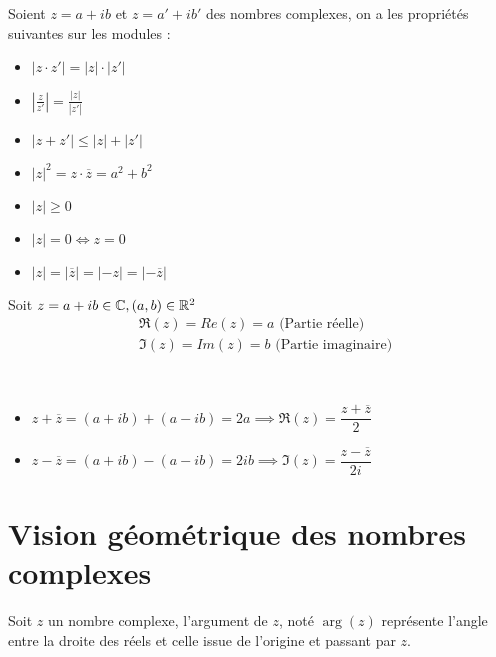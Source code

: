     \begin{proposition}
    Soient $z = a + ib$ et $z = a' + ib'$ des nombres complexes, on a les propriétés suivantes sur les modules :
    \begin{itemize}
        \item $|z \cdot z'| = |z| \cdot |z'|$
        \item $\left| \frac{z}{z'} \right| = \frac{|z|}{|z'|}$
        \item $|z + z'| \leq |z| + |z'|$
        \item $|z|^2 = z \cdot \overline{z} = a^2 + b^2$
        \item $|z| \geq 0$
        \item $|z| = 0 \iff z = 0$
        \item $|z| = |\overline{z}| = |-z| = |-\overline{z}|$
    \end{itemize}
\end{proposition}


    \begin{definition}
    Soit $z = a + ib \in \mathbb{C}, (a, b) \in \mathbb{R}^2$
    \begin{align*}
        &\Re(z) = Re(z) = a \text{ (Partie réelle)} \\
        &\Im(z) = Im(z) = b \text{ (Partie imaginaire)}
    \end{align*}
\end{definition}


\begin{proposition}~
    \begin{itemize}
        \item $z + \overline{z} = (a + ib) + (a - ib) = 2a \implies \Re(z) = \dfrac{z + \overline{z}}{2}$
        \item $z - \overline{z} = (a + ib) - (a - ib) = 2ib \implies \Im(z) = \dfrac{z - \overline{z}}{2i}$
    \end{itemize}
\end{proposition}
\section{Vision géométrique des nombres complexes}

    \begin{definition}
    Soit $z$ un nombre complexe, l'argument de $z$, noté $\arg{(z)}$ représente l'angle entre la droite des réels et celle issue de l'origine et passant par $z$.
\end{definition}


